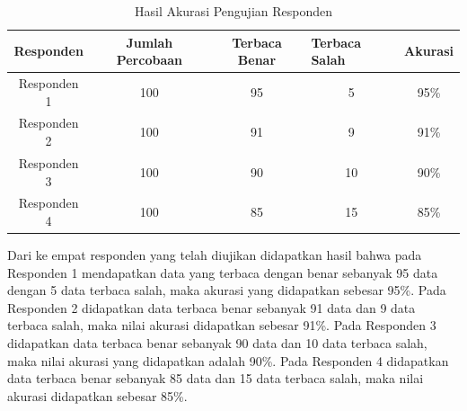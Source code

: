 \begin{table}[H]
  \centering
  \caption{Hasil Akurasi Pengujian Responden}
  \label{tab:hasilposisitengah}
  \begin{tabular}{|c|c|c|c|c|}
    \hline
    Responden & Jumlah Percobaan & Terbaca Benar & \multicolumn{1}{l|}{Terbaca Salah} & \multicolumn{1}{l|}{Akurasi} \\ \hline
    Responden 1         & 100              & 95           & 5                                  & 95\%                        \\ \hline
    Responden 2         & 100              & 91           & 9                                  & 91\%                         \\ \hline
    Responden 3         & 100              & 90           & 10                                  & 90\%                         \\ \hline
    Responden 4        & 100              & 85           & 15                                  & 85\%                         \\ \hline
    \end{tabular}
\end{table}

Dari ke empat responden yang telah diujikan didapatkan hasil bahwa pada Responden 1 mendapatkan data yang terbaca dengan benar sebanyak 95 data dengan 5 data terbaca salah, maka akurasi yang didapatkan sebesar 95\%. Pada Responden 2 didapatkan data terbaca benar sebanyak 91 data dan 9 data terbaca salah, maka nilai akurasi didapatkan sebesar 91\%. Pada Responden 3 didapatkan data terbaca benar sebanyak 90 data dan 10 data terbaca salah, maka nilai akurasi yang didapatkan adalah 90\%. Pada Responden 4 didapatkan data terbaca benar sebanyak 85 data dan 15 data terbaca salah, maka nilai akurasi didapatkan sebesar 85\%. 


